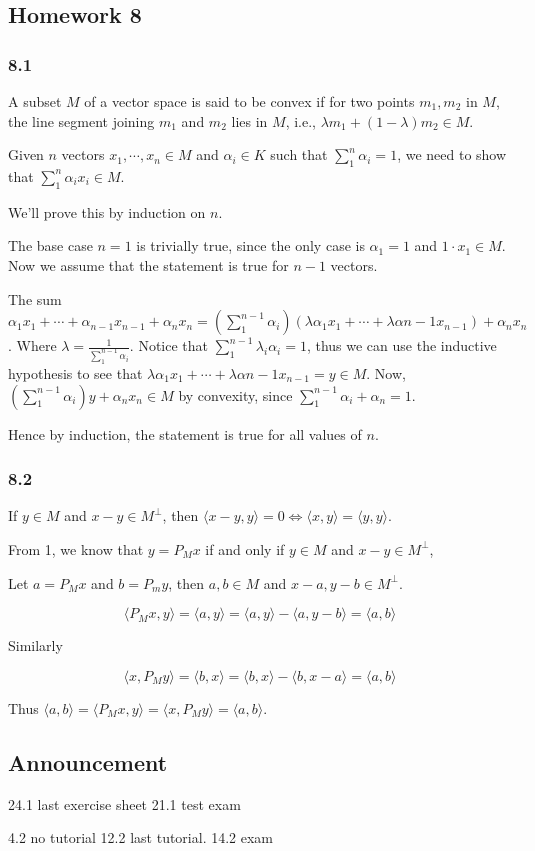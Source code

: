 \documentclass[11pt]{article}
\begin{document}
\subsection{Homework 8}
\label{sec:orgc3c1578}
\subsubsection{8.1}
\label{sec:orge09b395}
A subset \(M\) of a vector space is said to be convex if for two points \(m_1,
    m_2\) in \(M\), the line segment joining \(m_1\) and \(m_2\) lies in \(M\), i.e.,
\(\lambda m_1 + (1-\lambda)m_2 \in M\).

Given \(n\) vectors \(x_1, \cdots, x_n\in M\) and \(\alpha_i \in K\) such that
\(\sum_1^n \alpha_i = 1\), we need to show that \(\sum_1^n \alpha_i x_i \in M\).

We'll prove this by induction on \(n\).

The base case \(n=1\) is trivially true, since the only case is \(\alpha_1 = 1\)
and \(1\cdot x_1 \in M\). Now we assume that the statement is true for \(n-1\)
vectors.

The sum \(\alpha_1x_1 + \cdots + \alpha_{n-1}x_{n-1} + \alpha_nx_n=
    (\sum_1^{n-1}\alpha_i)(\lambda\alpha_1 x_1 + \cdots +
    \lambda\alpha{n-1}x_{n-1}) + \alpha_n x_n\). Where \(\lambda =
    \frac{1}{\sum_1^{n-1} \alpha_i}\). Notice that \(\sum_1^{n-1} \lambda_i
    \alpha_i = 1\), thus we can use the inductive hypothesis to see that
\(\lambda\alpha_1 x_1 + \cdots + \lambda\alpha{n-1}x_{n-1} = y \in M\). Now,
\((\sum_1^{n-1}\alpha_i)y + \alpha_n x_n \in M\) by convexity, since
\(\sum_1^{n-1}\alpha_i + \alpha_n = 1\).

Hence by induction, the statement is true for all values of \(n\).
\subsubsection{8.2}
\label{sec:org9a3d0bb}
If \(y \in M\) and \(x - y \in M^{\perp}\), then \(\langle x - y, y \rangle = 0
    \iff \langle x, y \rangle = \langle y, y \rangle\).

From 1, we know that \(y = P_Mx\) if and only if \(y \in M\) and \(x - y \in
    M^\perp\),

Let \(a = P_M x\) and \(b = P_m y\), then \(a, b \in M\) and \(x-a, y-b \in
    M^\perp\).

$$\langle P_M x, y \rangle = \langle a, y \rangle = \langle a, y \rangle - \langle a, y - b \rangle =
    \langle a, b\rangle$$

Similarly

$$\langle x, P_M y \rangle = \langle b, x \rangle = \langle b, x \rangle - \langle b, x - a \rangle =
    \langle a, b\rangle$$

Thus \(\langle a, b \rangle = \langle P_M x, y \rangle = \langle x, P_M y
    \rangle = \langle a, b\rangle\).
\subsection{Announcement}
\label{sec:orgf3972d5}
24.1 last exercise sheet
21.1 test exam

4.2 no tutorial
12.2 last tutorial.
14.2 exam
\end{document}

